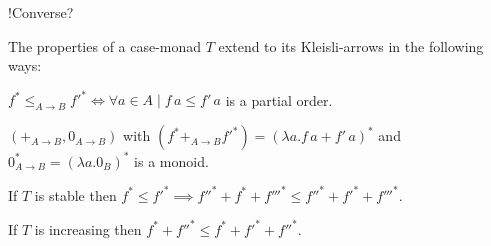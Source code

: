 \documentclass[runningheads,envcountsame]{llncs}
\begin{document}
!Converse?
\begin{lemma}
    The properties of a case-monad $T$ extend to its Kleisli-arrows in the following ways:
    \begin{lemmalist}
        \item $f^* \leq_{A \to B} f'^* \iff \forall a \in A \mid f\,a \leq f'\,a$ is a partial order.
        \item $(+_{A \to B}, 0_{A \to B})$ with $(f^* +_{A \to B} f'^*) = (\lambda a. f\,a + f'\,a)^*$ and $0_{A \to B}^* = (\lambda a. 0_B)^*$ is a monoid.
        \item If $T$ is stable then $f^* \leq f'^* \implies f''^* + f^* + f'''^* \leq f''^* + f'^* + f'''^*$.
        \item If $T$ is increasing then $f^* + f''^* \leq f^* + f'^* + f''^*$.
    \end{lemmalist}
\end{lemma}
\end{document}
